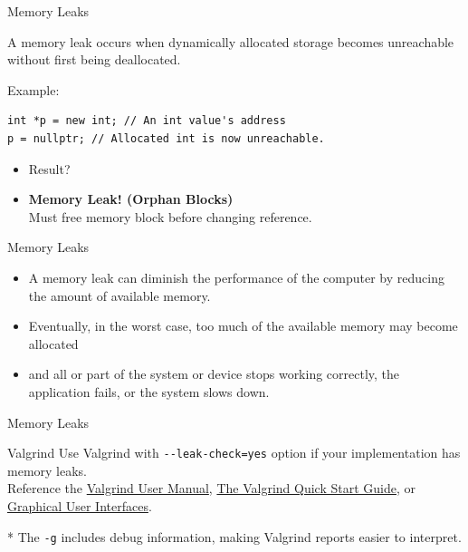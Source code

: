 \documentclass[14pt,aspectratio=1610]{beamer}
\begin{document}
\begin{frame}[fragile]{Memory Leaks}


A memory leak occurs when dynamically allocated storage becomes unreachable
without first being deallocated.\vspace{1em}

Example:
\begin{lstlisting}
int *p = new int; // An int value's address
p = nullptr; // Allocated int is now unreachable.
\end{lstlisting}

\begin{itemize}[<+->]
\item
  Result?
\item\textbf{Memory Leak! (Orphan Blocks)}\\
  Must free memory block before changing reference.
\end{itemize}
\end{frame}


\begin{frame}{Memory Leaks}
\begin{itemize}
\item
  A memory leak can diminish the performance of the computer by
  reducing the amount of available memory.
\item
  Eventually, in the worst case, too much of the available memory
  may become allocated
\item
  and all or part of the system or device stops working correctly,
  the application fails, or the system slows down.
\end{itemize}
\end{frame}

\begin{frame}{Memory Leaks}
  \begin{block}{Valgrind}
  Use Valgrind with \texttt{-{}-leak-check=yes} option if your implementation has
  memory leaks.\\
  Reference the \href{https://valgrind.org/docs/manual/manual.html}{Valgrind User Manual}, 
  \href{https://valgrind.org/docs/manual/quick-start.html}{The Valgrind Quick Start Guide}, or 
  \href{https://valgrind.org/downloads/guis.html}{Graphical User Interfaces}.
  
  * The \lstinline{-g} includes debug information, making Valgrind reports easier
  to interpret.
\end{block}
\end{frame}
\end{document}
